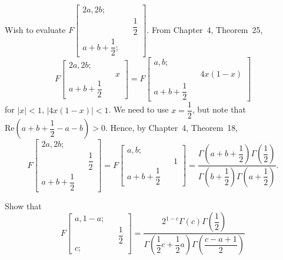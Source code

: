 \begin{solution}
Wish to evaluate $F \left[ \begin{array}{rlr}
2a,2b; & & \\
& & \dfrac{1}{2} \\
a+b+\dfrac{1}{2}; & & 
\end{array} \right]$. 
From Chapter~4, Theorem~25, 
$$F \left[ \begin{array}{rlr}
2a,2b; & & \\
& & x \\
a+b+\dfrac{1}{2} & & 
\end{array} \right] = F \left[ \begin{array}{rlr} 
a, b ; & & \\
& & 4x(1-x) \\
a+ b + \dfrac{1}{2} & & 
\end{array} \right]$$
for $|x| < 1$, $|4x(1-x)| < 1$. We need to use $x = \dfrac{1}{2}$, but note that $\mathrm{Re}(a+b+\dfrac{1}{2}-a-b) > 0$. Hence, by Chapter~4, Theorem~18,
$$F \left[ \begin{array}{rlr}
2a,2b; & & \\
& & \dfrac{1}{2} \\
a+b+\dfrac{1}{2} & &
\end{array} \right] = F \left[ \begin{array}{rlr}
a,b; & & \\
& & 1 \\
a+b+\dfrac{1}{2} & &
\end{array} \right] = \dfrac{\Gamma \left(a+b+\dfrac{1}{2} \right) \Gamma \left( \dfrac{1}{2} \right) }{\Gamma \left( b+ \dfrac{1}{2} \right) \Gamma \left( a + \dfrac{1}{2} \right)}.$$
\end{solution}
\begin{problem}\label{problem3chapter4}
Show that 
$$F \left[ \begin{array}{rlr}
a, 1-a; & & \\
& & \dfrac{1}{2} \\
c; & &
\end{array} \right] = \dfrac{2^{1-c}\Gamma(c) \Gamma \left( \dfrac{1}{2} \right)}{\Gamma \left( \dfrac{1}{2}c + \dfrac{1}{2} a \right) \Gamma \left( \dfrac{c-a+1}{2} \right)}$$
\end{problem}
